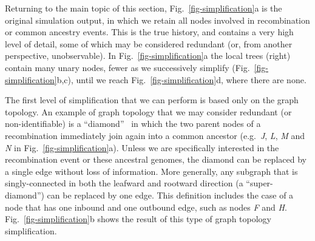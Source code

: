 \documentclass[9pt,twocolumn,twoside]{gsajnl}
\newcommand{\noderef}[1]{\textit{#1}}
\begin{document}
Returning to the main topic of this section,
Fig.~\ref{fig-simplification}a is the original simulation output, in
which we retain all nodes involved in recombination
or common ancestry events. This is the true history, and contains
a very high level of detail, some of which may be considered
redundant (or, from another perspective, unobservable).
In Fig.~\ref{fig-simplification}a the local trees (right)
contain many unary nodes, fewer as  we successively
simplify (Fig.~\ref{fig-simplification}b,c),
until we reach Fig.~\ref{fig-simplification}d, where there are none.

The first level of simplification that we can perform is based only
on the graph topology.
An example of graph topology that we may consider redundant
(or non-identifiable) is a
``diamond''~\citep{rasmussen2014genome}
in which the two parent nodes of a recombination immediately
join again into a common ancestor (e.g.~\noderef{J}, \noderef{L}, \noderef{M}
and \noderef{N} in Fig.~\ref{fig-simplification}a).
Unless we are specifically
interested in the recombination event or these ancestral genomes,
the diamond can be replaced by a single edge without loss of
information.
More generally, any subgraph that is singly-connected in both the leafward and
rootward direction (a ``super-diamond'') can be replaced by one edge.
This definition includes the case
of a node that has one inbound and one outbound edge, such as
nodes \noderef{F} and \noderef{H}.
Fig.~\ref{fig-simplification}b shows the result of this type of
graph topology simplification.
\end{document}
